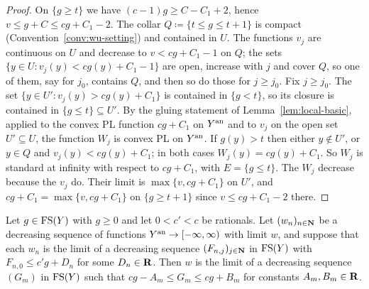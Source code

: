 \begin{proof}
On $\{g\ge t\}$ we have $(c-1)g\ge C-C_1+2$, hence $v\le g+C\le cg+C_1-2$. The collar
$Q\coloneqq\{t\le g\le t+1\}$ is compact (Convention~\ref{conv:wu-setting}) and contained in $U$. The
functions $v_j$ are continuous on $U$ and decrease to $v<cg+C_1-1$ on $Q$; the sets
$\{y\in U:v_j(y)<cg(y)+C_1-1\}$ are open, increase with $j$ and cover $Q$, so one of them, say for $j_0$,
contains $Q$, and then so do those for $j\ge j_0$. Fix $j\ge j_0$. The set
$\{y\in U':v_j(y)>cg(y)+C_1\}$ is contained in $\{g<t\}$, so its closure is contained in $\{g\le t\}\subseteq U'$.
By the gluing statement of Lemma~\ref{lem:local-basic}, applied to the convex PL function $cg+C_1$ on $Y^{\mathrm{an}}$
and to $v_j$ on the open set $U'\subseteq U$, the function $W_j$ is convex PL on $Y^{\mathrm{an}}$. If $g(y)>t$ then
either $y\notin U'$, or $y\in Q$ and $v_j(y)<cg(y)+C_1$; in both cases $W_j(y)=cg(y)+C_1$. So $W_j$ is standard
at infinity with respect to $cg+C_1$, with $E=\{g\le t\}$. The $W_j$ decrease because the $v_j$ do. Their limit
is $\max\{v,cg+C_1\}$ on $U'$, and $cg+C_1=\max\{v,cg+C_1\}$ on $\{g\ge t+1\}$ since $v\le cg+C_1-2$ there.
\end{proof}

\begin{lemma}\label{lem:wu-growth-diagonal}
\leanok
{}
Let $g\in\mathrm{FS}(Y)$ with $g\ge0$ and let $0<c'<c$ be rationals. Let $(w_n)_{n\in\mathbf{N}}$ be a decreasing sequence of
functions $Y^{\mathrm{an}}\to[-\infty,\infty)$ with limit $w$, and suppose that each $w_n$ is the limit of a decreasing
sequence $(F_{n,j})_{j\in\mathbf{N}}$ in $\mathrm{FS}(Y)$ with $F_{n,0}\le c'g+D_n$ for some $D_n\in\mathbf{R}$. Then $w$ is the limit
of a decreasing sequence $(G_m)$ in $\mathrm{FS}(Y)$ such that $cg-A_m\le G_m\le cg+B_m$ for constants $A_m,B_m\in\mathbf{R}$.
\end{lemma}


